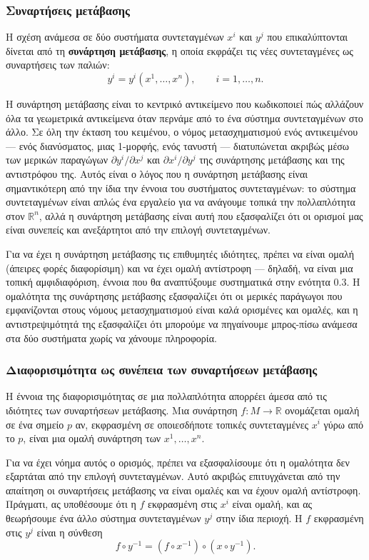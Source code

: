 \documentclass[12pt]{article}
\begin{document}
\subsubsection{Συναρτήσεις μετάβασης}

Η σχέση ανάμεσα σε δύο συστήματα συντεταγμένων $x^i$ και $y^j$ που επικαλύπτονται δίνεται από τη \textbf{συνάρτηση μετάβασης}, η οποία εκφράζει τις νέες συντεταγμένες ως συναρτήσεις των παλιών:
\[
y^i = y^i(x^1, \dots, x^n), \qquad i = 1, \dots, n. \tag{0.1}
\]

Η συνάρτηση μετάβασης είναι το κεντρικό αντικείμενο που κωδικοποιεί πώς αλλάζουν όλα τα γεωμετρικά αντικείμενα όταν περνάμε από το ένα σύστημα συντεταγμένων στο άλλο. Σε όλη την έκταση του κειμένου, ο νόμος μετασχηματισμού ενός αντικειμένου --- ενός διανύσματος, μιας 1-μορφής, ενός τανυστή --- διατυπώνεται ακριβώς μέσω των μερικών παραγώγων $\partial y^i / \partial x^j$ και $\partial x^i / \partial y^j$ της συνάρτησης μετάβασης και της αντιστρόφου της. Αυτός είναι ο λόγος που η συνάρτηση μετάβασης είναι σημαντικότερη από την ίδια την έννοια του συστήματος συντεταγμένων: το σύστημα συντεταγμένων είναι απλώς ένα εργαλείο για να ανάγουμε τοπικά την πολλαπλότητα στον $\mathbb{R}^n$, αλλά η συνάρτηση μετάβασης είναι αυτή που εξασφαλίζει ότι οι ορισμοί μας είναι συνεπείς και ανεξάρτητοι από την επιλογή συντεταγμένων.

Για να έχει η συνάρτηση μετάβασης τις επιθυμητές ιδιότητες, πρέπει να είναι ομαλή (άπειρες φορές διαφορίσιμη) και να έχει ομαλή αντίστροφη --- δηλαδή, να είναι μια τοπική αμφιδιαφόριση, έννοια που θα αναπτύξουμε συστηματικά στην ενότητα 0.3. Η ομαλότητα της συνάρτησης μετάβασης εξασφαλίζει ότι οι μερικές παράγωγοι που εμφανίζονται στους νόμους μετασχηματισμού είναι καλά ορισμένες και ομαλές, και η αντιστρεψιμότητά της εξασφαλίζει ότι μπορούμε να πηγαίνουμε μπρος-πίσω ανάμεσα στα δύο συστήματα χωρίς να χάνουμε πληροφορία.

\subsubsection{Διαφορισιμότητα ως συνέπεια των συναρτήσεων μετάβασης}

Η έννοια της διαφορισιμότητας σε μια πολλαπλότητα απορρέει άμεσα από τις ιδιότητες των συναρτήσεων μετάβασης. Μια συνάρτηση $f: M \to \mathbb{R}$ ονομάζεται ομαλή σε ένα σημείο $p$ αν, εκφρασμένη σε οποιεσδήποτε τοπικές συντεταγμένες $x^i$ γύρω από το $p$, είναι μια ομαλή συνάρτηση των $x^1, \dots, x^n$.

Για να έχει νόημα αυτός ο ορισμός, πρέπει να εξασφαλίσουμε ότι η ομαλότητα δεν εξαρτάται από την επιλογή συντεταγμένων. Αυτό ακριβώς επιτυγχάνεται από την απαίτηση οι συναρτήσεις μετάβασης να είναι ομαλές και να έχουν ομαλή αντίστροφη. Πράγματι, ας υποθέσουμε ότι η $f$ εκφρασμένη στις $x^i$ είναι ομαλή, και ας θεωρήσουμε ένα άλλο σύστημα συντεταγμένων $y^j$ στην ίδια περιοχή. Η $f$ εκφρασμένη στις $y^j$ είναι η σύνθεση
\[
f \circ y^{-1} = (f \circ x^{-1}) \circ (x \circ y^{-1}).
\]
\end{document}
